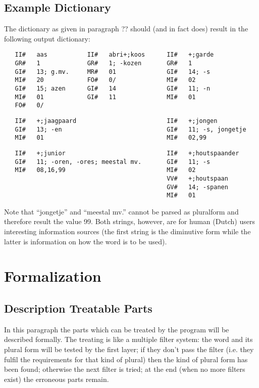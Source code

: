 \subsection{Example Dictionary}

The dictionary as given in paragraph ?? should (and in fact does) result in the 
following output dictionary:

\begin{verbatim}
   II#   aas           II#   abri+;koos      II#   +;garde
   GR#   1             GR#   1; -kozen       GR#   1
   GI#   13; g.mv.     MR#   01              GI#   14; -s
   MI#   20            FO#   0/              MI#   02
   GI#   15; azen      GI#   14              GI#   11; -n
   MI#   01            GI#   11              MI#   01
   FO#   0/
\end{verbatim}

\begin{verbatim}
   II#   +;jaagpaard                         II#   +;jongen
   GI#   13; -en                             GI#   11; -s, jongetje
   MI#   01                                  MI#   02,99
\end{verbatim}

\begin{verbatim}
   II#   +;junior                            II#   +;houtspaander
   GI#   11; -oren, -ores; meestal mv.       GI#   11; -s
   MI#   08,16,99                            MI#   02
                                             VV#   +;houtspaan
                                             GV#   14; -spanen
                                             MI#   01
\end{verbatim}

Note that ``jongetje'' and ``meestal mv.'' cannot be parsed as pluralform and 
therefore result the value 99. Both strings, however, are for human (Dutch) 
users interesting information sources (the first string is the diminutive form 
while the latter is information on how the word is to be used).

\newpage
\section{Formalization}

\subsection{Description Treatable Parts}

In this paragraph the parts which can be treated by the program will be 
described formally. The treating is like a multiple filter system: the word 
and its plural form will be tested by the first layer; if they don't pass the 
filter (i.e. they fulfil the requirements for that kind of plural) then the 
kind of plural form has been found; otherwise the next filter is tried; at the 
end (when no more filters exist) the erroneous parts remain.

